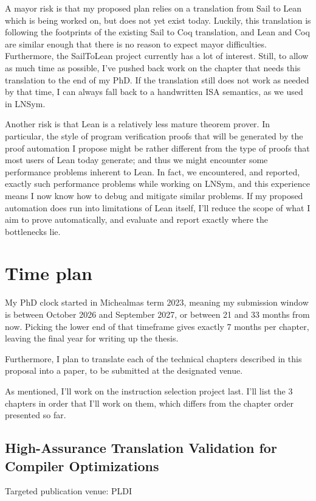 \documentclass[a4paper]{scrartcl}
\begin{document}
A mayor risk is that my proposed plan relies on a translation from Sail to Lean 
which is being worked on, but does not yet exist today. Luckily, this translation
is following the footprints of the existing Sail to Coq translation, 
and Lean and Coq are similar enough that there is no reason to expect mayor difficulties.
Furthermore, the SailToLean project currently has a lot of interest.
Still, to allow as much time as possible, I've pushed back work on the chapter that needs this
translation to the end of my PhD. If the translation still does not work as needed by that time,
I can always fall back to a handwritten ISA semantics, as we used in LNSym.

Another risk is that Lean is a relatively less mature theorem prover.
In particular, the style of program verification proofs that will be generated by the proof automation
I propose might be rather different from the type of proofs that most users of Lean
today generate; and thus we might encounter some performance problems inherent to Lean.
In fact, we encountered, and reported, exactly such performance problems while working on LNSym, and this experience means I now know how to debug and mitigate similar
problems.
If my proposed automation does run into limitations of Lean itself,
I'll reduce the scope of what I aim to prove automatically, and 
evaluate and report exactly where the bottlenecks lie.


\section{Time plan}\label{timeplan}

My PhD clock started in Michealmas term 2023, meaning my submission
window is between October 2026 and September 2027, or between 21 and 33
months from now. Picking the lower end of that timeframe gives exactly 7
months per chapter, leaving the final year for writing up the thesis.

Furthermore, I plan to translate each of the technical chapters described in this proposal into a paper, to be submitted at the designated venue. 

As mentioned, I'll work on the instruction selection project last.
I'll list the 3 chapters in order that I'll work on them, which differs from the
chapter order presented so far.

\subsection*{High-Assurance Translation Validation for Compiler Optimizations}
Targeted publication venue: PLDI
\end{document}
